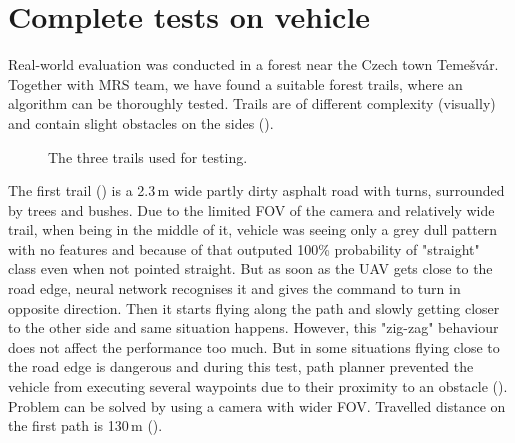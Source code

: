 \section{Complete tests on vehicle}

Real-world evaluation was conducted in a forest near the Czech town Temešvár. Together with \acs{MRS} team, we have found a suitable forest trails, where an algorithm can be thoroughly tested. Trails are of different complexity (visually) and contain slight obstacles on the sides (). 

\begin{figure}[!h]

  \centering

  \centering	
  


  \centering
  \caption{The three trails used for testing.}
  \label{fig:trails}
\end{figure}

The first trail () is a 2.3\,m wide partly dirty asphalt road with turns, surrounded by trees and bushes. Due to the limited \acs{FOV} of the camera and relatively wide trail, when being in the middle of it, vehicle was seeing only a grey dull pattern with no features and because of that outputed 100\% probability of "straight" class even when not pointed straight. But as soon as the \acs{UAV} gets close to the road edge, neural network recognises it and gives the command to turn in opposite direction. Then it starts flying along the path and slowly getting closer to the other side and same situation happens. However, this "zig-zag" behaviour does not affect the performance too much. But in some situations flying close to the road edge is dangerous and during this test, path planner prevented the vehicle from executing several waypoints due to their proximity to an obstacle (). Problem can be solved by using a camera with wider \acs{FOV}. Travelled distance on the first path is 130\,m ().

